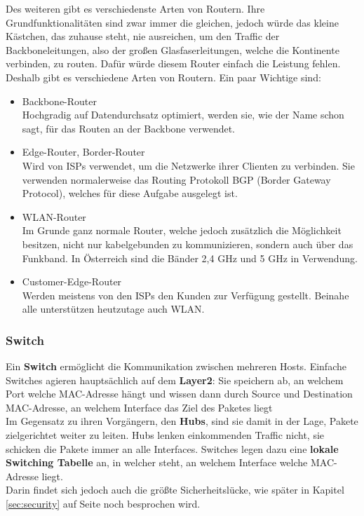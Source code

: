 \documentclass[12pt,a4paper]{report}
\begin{document}
\begin{onehalfspace}
Des weiteren gibt es verschiedenste Arten von Routern. Ihre Grundfunktionalitäten sind zwar immer die gleichen, jedoch würde das kleine Kästchen, das zuhause steht, nie ausreichen, um den Traffic der Backboneleitungen, also der großen Glasfaserleitungen, welche die Kontinente verbinden, zu routen. Dafür würde diesem Router einfach die Leistung fehlen.\\
Deshalb gibt es verschiedene Arten von Routern. Ein paar Wichtige sind:\\
\begin{itemize}
\item Backbone-Router\\
Hochgradig auf Datendurchsatz optimiert, werden sie, wie der Name schon sagt, für das Routen an der Backbone verwendet.
\item Edge-Router, Border-Router\\
Wird von ISPs verwendet, um die Netzwerke ihrer Clienten zu verbinden. Sie verwenden normalerweise das Routing Protokoll BGP (Border Gateway Protocol), welches für diese Aufgabe ausgelegt ist.
\item WLAN-Router\\
Im Grunde ganz normale Router, welche jedoch zusätzlich die Möglichkeit besitzen, nicht nur kabelgebunden zu kommunizieren, sondern auch über das Funkband. In Österreich sind die Bänder 2,4 GHz und 5 GHz in Verwendung.
\item Customer-Edge-Router\\
Werden meistens von den ISPs den Kunden zur Verfügung gestellt. Beinahe alle unterstützen heutzutage auch WLAN.
\end{itemize}
\subsubsection{Switch}
Ein \textbf{Switch} ermöglicht die Kommunikation zwischen mehreren Hosts. Einfache Switches agieren hauptsächlich auf dem \textbf{Layer2}: Sie speichern ab, an welchem Port welche MAC-Adresse hängt und wissen dann durch Source und Destination MAC-Adresse, an welchem Interface das Ziel des Paketes liegt\\

Im Gegensatz zu ihren Vorgängern, den \textbf{Hubs}, sind sie damit in der Lage, Pakete zielgerichtet weiter zu leiten. Hubs lenken einkommenden Traffic nicht, sie schicken die Pakete immer an alle Interfaces. Switches legen dazu eine \textbf{lokale Switching Tabelle} an, in welcher steht, an welchem Interface welche MAC-Adresse liegt.\\
Darin findet sich jedoch auch die größte Sicherheitslücke, wie später in Kapitel \ref{sec:security} auf Seite \pageref{sec:security} noch besprochen wird.\\


\end{onehalfspace}
\end{document}
